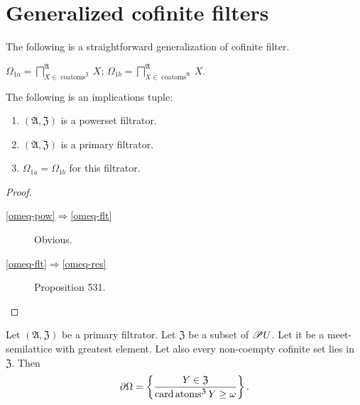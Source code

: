 \chapter{Generalized cofinite filters}

The following is a straightforward generalization of cofinite filter.

\begin{defn}
  $\Omega_{1 a} = \bigsqcap^{\mathfrak{A}}_{X \in
  \operatorname{coatoms}^{\mathfrak{Z}}} X$; $\Omega_{1 b} =
  \bigsqcap^{\mathfrak{A}}_{X \in \operatorname{coatoms}^{\mathfrak{A}}} X$.
\end{defn}

\begin{prop}
The following is an implications tuple:
\begin{enumerate}
 \item\label{omeq-pow} $(\mathfrak{A},\mathfrak{Z})$ is a powerset filtrator.
 \item\label{omeq-flt} $(\mathfrak{A},\mathfrak{Z})$ is a primary filtrator.
 \item\label{omeq-res} $\Omega_{1 a} = \Omega_{1 b}$ for this filtrator.
\end{enumerate}  
\end{prop}

\begin{proof}
~
\begin{description}
 \item[\ref{omeq-pow}$\Rightarrow$\ref{omeq-flt}] Obvious.
 \item[\ref{omeq-flt}$\Rightarrow$\ref{omeq-res}] Proposition 531.
\end{description}
\end{proof}

\begin{prop}
  Let $(\mathfrak{A},\mathfrak{Z})$ be a primary filtrator.
  Let $\mathfrak{Z}$ be a subset of $\mathscr{P} U$. Let it be a
  meet-semilattice with greatest element.
  Let also every non-coempty cofinite set lies in
  $\mathfrak{Z}$. Then
  \begin{equation}
    \partial \Omega = \left\{ \frac{ Y \in \mathfrak{Z} }{
    \operatorname{card} \operatorname{atoms}^{\mathfrak{Z}} Y \geq \omega }\right\} .
    \label{d-cofin}
  \end{equation}
\end{prop}

